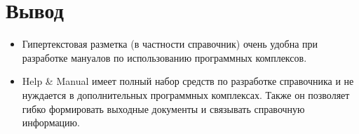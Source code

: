 		\FloatBarrier
		
		
		
	\section{Вывод}
	\begin{itemize}
		\item Гипертекстовая разметка (в частности справочник) очень удобна при разработке мануалов по использованию программных комплексов.
		\item Help \& Manual имеет полный набор средств по разработке справочника и не нуждается в дополнительных программных комплексах. Также он позволяет гибко формировать выходные документы и связывать справочную информацию.
	\end{itemize}
	